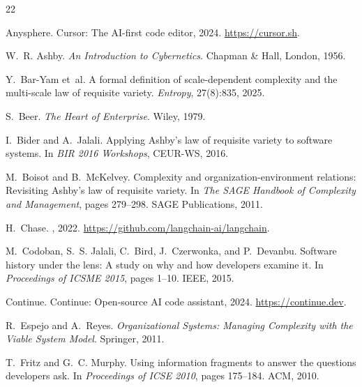 \documentclass[11pt]{article}
\begin{document}
\begin{thebibliography}{22}

Anysphere.
\newblock Cursor: The AI-first code editor, 2024.
\newblock \url{https://cursor.sh}.

W.~R. Ashby.
\newblock \emph{An Introduction to Cybernetics}.
\newblock Chapman \& Hall, London, 1956.

Y.~Bar-Yam et~al.
\newblock A formal definition of scale-dependent complexity and the multi-scale law of requisite variety.
\newblock \emph{Entropy}, 27(8):835, 2025.

S.~Beer.
\newblock \emph{The Heart of Enterprise}.
\newblock Wiley, 1979.

I.~Bider and A.~Jalali.
\newblock Applying {A}shby's law of requisite variety to software systems.
\newblock In \emph{BIR 2016 Workshops}, CEUR-WS, 2016.

M.~Boisot and B.~McKelvey.
\newblock Complexity and organization-environment relations: Revisiting {A}shby's law of requisite variety.
\newblock In \emph{The SAGE Handbook of Complexity and Management}, pages 279--298. SAGE Publications, 2011.

H.~Chase.
, 2022.
\newblock \url{https://github.com/langchain-ai/langchain}.

M.~Codoban, S.~S. Jalali, C.~Bird, J.~Czerwonka, and P.~Devanbu.
\newblock Software history under the lens: A study on why and how developers examine it.
\newblock In \emph{Proceedings of ICSME 2015}, pages 1--10. IEEE, 2015.

Continue.
\newblock Continue: Open-source {AI} code assistant, 2024.
\newblock \url{https://continue.dev}.

R.~Espejo and A.~Reyes.
\newblock \emph{Organizational Systems: Managing Complexity with the Viable System Model}.
\newblock Springer, 2011.

T.~Fritz and G.~C. Murphy.
\newblock Using information fragments to answer the questions developers ask.
\newblock In \emph{Proceedings of ICSE 2010}, pages 175--184. ACM, 2010.


\end{thebibliography}
\end{document}
